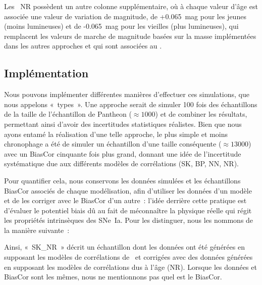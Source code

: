 \documentclass[../main/main.tex]{subfiles}
\begin{document}
Les \hostlib\ NR possèdent un autre colonne supplémentaire, où à chaque valeur
d'âge est associée une valeur de variation de magnitude, de +\SI{0,065}{mag}
pour les jeunes (moins lumineuses) et de -\SI{0,065}{mag} pour les vieilles
(plus lumineuses), qui remplacent les valeurs de marche de magnitude basées sur
la masse implémentées dans les autres approches et qui sont associées au
\wgtmap.

\subsection{Implémentation}\label{ssec:snaimpl} 

Nous pouvons implémenter différentes manières d'effectuer ces simulations, que
nous appelons «~types~». Une approche serait de simuler 100 fois des
échantillons de la taille de l'échantillon de Pantheon ($\approx \num{1000}$) et
de combiner les résultats, permettant ainsi d'avoir des incertitudes
statistiques réalistes. Bien que nous ayons entamé la réalisation d'une telle
approche, le plus simple et moins chronophage a été de simuler un échantillon
d'une taille conséquente ($\approx \num{13 000}$) avec un BiasCor cinquante fois
plus grand, donnant une idée de l'incertitude systématique due aux différents
modèles de corrélations (SK, BP, NN, NR).

Pour quantifier cela, nous conservons les données simulées et les échantillons
BiasCor associés de chaque modélisation, afin d'utiliser les données d'un modèle
et de les corriger avec le BiasCor d'un autre~: l'idée derrière cette pratique
est d'évaluer le potentiel biais dû au fait de méconnaître la physique réelle
qui régit les propriétés intrinsèques des SNe~Ia. Pour les distinguer, nous les
nommons de la manière suivante~:
\begin{center}
\end{center}
Ainsi, «~SK\_NR~» décrit un échantillon dont les données ont été générées en
supposant les modèles de corrélations de~ et corrigées
avec des données générées en supposant les modèles de corrélations dus à l'âge
(NR). Lorsque les données et BiasCor sont les mêmes, nous ne mentionnons pas
quel est le BiasCor. 
\end{document}
